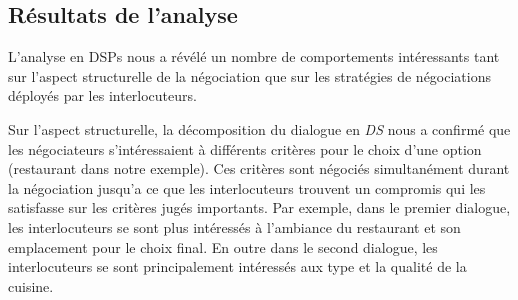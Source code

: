 		\subsection{Résultats de l'analyse}
			L'analyse en DSPs nous a révélé un nombre de comportements intéressants tant sur l'aspect structurelle de la négociation que sur les stratégies de négociations déployés par les interlocuteurs. 	
			
			Sur l'aspect structurelle, la décomposition du dialogue en \emph{DS} nous a confirmé que les négociateurs s'intéressaient à différents critères pour le choix d'une option (restaurant dans notre exemple). Ces critères sont négociés simultanément durant la négociation jusqu'a ce que les interlocuteurs trouvent un compromis qui les satisfasse sur les critères jugés importants. 
			Par exemple, dans le premier dialogue, les interlocuteurs se sont plus intéressés à l'ambiance du restaurant et son emplacement pour le choix final. En outre dans le second dialogue, les interlocuteurs se sont principalement intéressés aux type et la qualité de la cuisine.
			    
